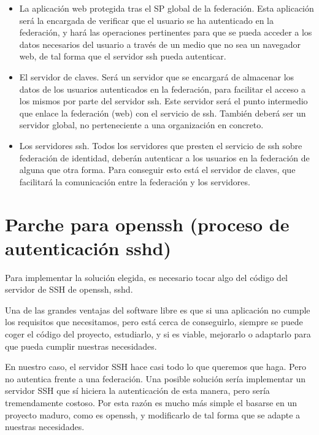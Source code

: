     \begin{itemize}
        
        \item La aplicación web protegida tras el SP global de la
        federación. Esta aplicación será la encargada de verificar que el
        usuario se ha autenticado en la federación, y hará las operaciones
        pertinentes para que se pueda acceder a los datos necesarios del
        usuario a través de un medio que no sea un navegador web, de tal
        forma que el servidor ssh pueda autenticar.

        \item El servidor de claves. Será un servidor que se encargará de
        almacenar los datos de los usuarios autenticados en la federación,
        para facilitar el acceso a los mismos por parte del servidor ssh.
        Este servidor será el punto intermedio que enlace la federación
        (web) con el servicio de ssh. También deberá ser un servidor
        global, no perteneciente a una organización en concreto.

        \item Los servidores ssh. Todos los servidores que presten el
        servicio de ssh sobre federación de identidad, deberán autenticar a
        los usuarios en la federación de alguna que otra forma. Para
        conseguir esto está el servidor de claves, que facilitará la
        comunicación entre la federación y los servidores.

    \end{itemize}

    \section{Parche para openssh (proceso de autenticación sshd)}
    \label{openssh}

    Para implementar la solución elegida, es necesario tocar algo del
    código del servidor de SSH de openssh, sshd.

    Una de las grandes ventajas del software libre es que si una aplicación
    no cumple los requisitos que necesitamos, pero está cerca de
    conseguirlo, siempre se puede coger el código del proyecto, estudiarlo,
    y si es viable, mejorarlo o adaptarlo para que pueda cumplir nuestras
    necesidades.

    En nuestro caso, el servidor SSH hace casi todo lo que queremos que
    haga. Pero no autentica frente a una federación. Una posible solución
    sería implementar un servidor SSH que sí hiciera la autenticación de
    esta manera, pero sería tremendamente costoso. Por esta razón es mucho
    más simple el basarse en un proyecto maduro, como es openssh, y
    modificarlo de tal forma que se adapte a nuestras necesidades.

